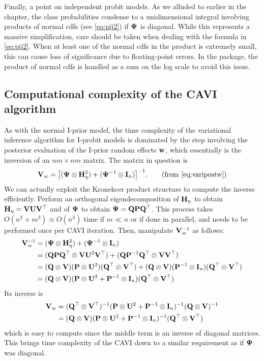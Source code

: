 Finally, a point on independent probit models.
As we alluded to earlier in the chapter, the class probabilities condense to a unidimensional integral involving products of normal cdfs (see \cref{eq:pij2}) if ${\bm\Psi}$ is diagonal.
While this represents a massive simplification, care should be taken when dealing with the formula in \cref{eq:pij2}.
When at least one of the normal cdfs in the product is extremely small, this can cause loss of significance due to floating-point errors.
In the  package, the product of normal cdfs is handled as a sum on the log scale to avoid this issue.

\subsection{Computational complexity of the CAVI algorithm}
\label{sec:complxiprobit}

As with the normal I-prior model, the time complexity of the variational inference algorithm for I-probit models is dominated by the step involving the posterior evaluation of the I-prior random effects ${\mathbf w}$, which essentially is the inversion of an $nm \times nm$ matrix.
The matrix in question is %
\begin{align}
  \bV_w = \big[ (\bPsi \otimes \bH_\eta^2) + (\bPsi^{-1} \otimes \bI_n) \big]^{-1}. \tag{from \ref{eq:varipostw}}
\end{align}
We can actually exploit the Kronekcer product structure to compute the inverse efficiently.
Perform an orthogonal eigendecomposition of ${\mathbf H}_\eta$ to obtain ${\mathbf H}_\eta = {\mathbf V}{\mathbf U}{\mathbf V}^\top$ and of ${\bm\Psi}$ to obtain ${\bm\Psi} = {\mathbf Q}{\mathbf P}{\mathbf Q}^\top$.
This process takes $O(n^3 + m^3) \approx O(n^3)$ time if $m\ll n$ or if done in parallel, and needs to be performed once per CAVI iteration.
Then, manipulate ${\mathbf V}_w^{-1}$ as follows:
\begin{align*}
  {\mathbf V}_w^{-1} 
  &= ({\bm\Psi} \otimes {\mathbf H}_\eta^2) + ({\bm\Psi}^{-1} \otimes {\mathbf I}_n) \\
  &= ({\mathbf Q}{\mathbf P}{\mathbf Q}^\top \otimes {\mathbf V}{\mathbf U}^2{\mathbf V}^\top) + ({\mathbf Q}{\mathbf P}^{-1}{\mathbf Q}^\top \otimes {\mathbf V}{\mathbf V}^\top) \\
  &= ({\mathbf Q} \otimes {\mathbf V})({\mathbf P} \otimes {\mathbf U}^2)({\mathbf Q}^\top \otimes {\mathbf V}^\top) + 
  ({\mathbf Q} \otimes {\mathbf V})({\mathbf P}^{-1} \otimes {\mathbf I}_n)({\mathbf Q}^\top \otimes {\mathbf V}^\top) \\
  &= ({\mathbf Q} \otimes {\mathbf V})({\mathbf P} \otimes {\mathbf U}^2 + {\mathbf P}^{-1} \otimes {\mathbf I}_n)({\mathbf Q}^\top \otimes {\mathbf V}^\top) 
\end{align*}
Its inverse is 
\begin{align*}
  {\mathbf V}_w 
  &=  ({\mathbf Q}^\top \otimes {\mathbf V}^\top)^{-1}({\mathbf P} \otimes {\mathbf U}^2 + {\mathbf P}^{-1} \otimes {\mathbf I}_n)^{-1} ({\mathbf Q} \otimes {\mathbf V})^{-1} \\
  &= ({\mathbf Q} \otimes {\mathbf V})({\mathbf P} \otimes {\mathbf U}^2 + {\mathbf P}^{-1} \otimes {\mathbf I}_n)^{-1}({\mathbf Q}^\top \otimes {\mathbf V}^\top)
\end{align*}
which is easy to compute since the middle term is an inverse of diagonal matrices.
This brings time complexity of the CAVI down to a similar requirement as if ${\bm\Psi}$ was diagonal.

